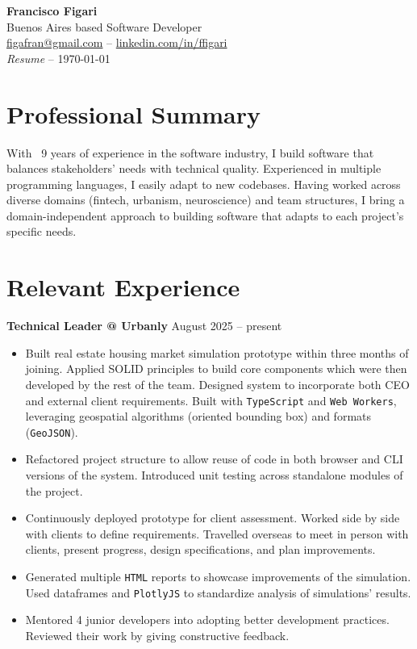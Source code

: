 \documentclass[a4paper]{article}
\begin{document}
\begin{center}
  {\Large \textbf{Francisco Figari}} \\[4pt]
  Buenos Aires based Software Developer \\[2pt]
  {\small \href{mailto:figafran@gmail.com}{figafran@gmail.com} -- \href{https://www.linkedin.com/in/ffigari}{linkedin.com/in/ffigari}} \\[2pt]
  {\small \textit{Resume} -- \monthyeardate\today}
\end{center}

\vspace{0.5em}

\section*{Professional Summary}

With ~9 years of experience in the software industry, I build software that
balances stakeholders' needs with technical quality. Experienced in multiple
programming languages, I easily adapt to new codebases. Having worked across
diverse domains (fintech, urbanism, neuroscience) and team structures, I bring a
domain-independent approach to building software that adapts to each project's
specific needs.

\section*{Relevant Experience}

\textbf{Technical Leader @ Urbanly} \hfill August 2025 -- present
\begin{itemize}
  \item Built real estate housing market simulation prototype within three
    months of joining. Applied SOLID principles to build core components
    which were then developed by the rest of the team. Designed system to
    incorporate both CEO and external client requirements. Built with
    \texttt{TypeScript} and \texttt{Web Workers}, leveraging geospatial
    algorithms (oriented bounding box) and formats (\texttt{GeoJSON}).
  \item Refactored project structure to allow reuse of code in both browser and
    CLI versions of the system. Introduced unit testing across standalone
    modules of the project.
  \item Continuously deployed prototype for client assessment. Worked side by
    side with clients to define requirements. Travelled overseas to meet in
    person with clients, present progress, design specifications, and plan
    improvements.
  \item Generated multiple \texttt{HTML} reports to showcase improvements of the
    simulation. Used dataframes and \texttt{PlotlyJS} to standardize analysis of
    simulations' results.
  \item Mentored 4 junior developers into adopting better development practices.
    Reviewed their work by giving constructive feedback.
\end{itemize}
\end{document}
